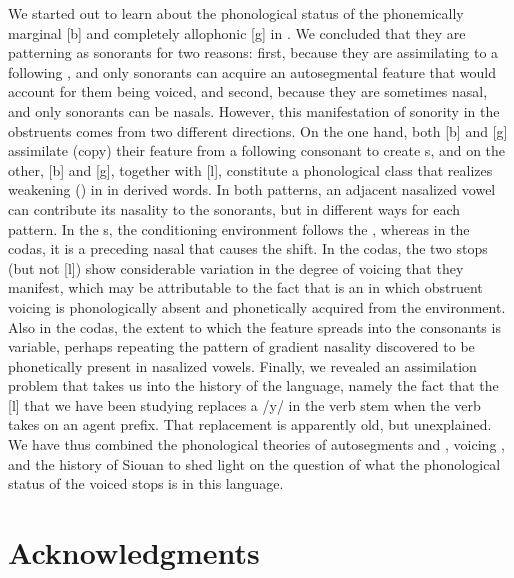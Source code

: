 \documentclass[output=paper]{LSP/langsci}
\begin{document}
We started out to learn about the phonological status of the phonemically marginal [b] and completely allophonic [g] in . We concluded that they are patterning as sonorants for two reasons: first, because they are assimilating to a following , and only sonorants can acquire an autosegmental feature that would account for them being voiced, and second, because they are sometimes nasal, and only sonorants can be nasals. However, this manifestation of sonority in the obstruents comes from two different directions. On the one hand, both [b] and [g] assimilate (copy) their  feature from a following consonant to create s, and on the other, [b] and [g], together with [l], constitute a phonological class that realizes weakening () in  in derived words. In both patterns, an adjacent nasalized vowel can contribute its nasality to the sonorants, but in different ways for each pattern. In the s, the conditioning environment follows the , whereas in the codas, it is a preceding nasal that causes the shift. In the codas, the two stops (but not [l]) show considerable variation in the degree of voicing that they manifest, which may be attributable to the fact that  is an  in which obstruent voicing is phonologically absent and phonetically acquired from the environment. Also in the codas, the extent to which the  feature spreads into the consonants is variable, perhaps repeating the pattern of gradient nasality discovered to be phonetically present in nasalized vowels. Finally, we revealed an assimilation problem that takes us into the history of the language, namely the fact that the [l] that we have been studying replaces a /y/ in the verb stem when the verb takes on an agent prefix. That replacement is apparently old, but unexplained.
We have thus combined the phonological theories of autosegments and , voicing , and the history of Siouan to shed light on the question of what the phonological status of the voiced stops is in this language.

\section*{Acknowledgments}
\end{document}
